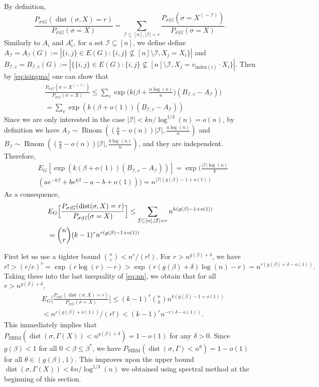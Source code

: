 \documentclass[conference]{IEEEtran}
\DeclareMathOperator{\SIBM}{SIBM}
\newcommand{\cI}{\mathcal{I}}
\DeclareMathOperator{\dist}{dist}
\DeclareMathOperator{\Binom}{Binom}
\begin{document}
By definition,
$$
\frac{P_{\sigma|G} ( \dist(\sigma, X) = r )}{P_{\sigma|G}(\sigma= X)}
=\sum_{\cI\subseteq[n],|\cI|=r} \frac{P_{\sigma|G} ( \sigma= X^{(\sim \cI)} )} {P_{\sigma|G}(\sigma= X)} .
$$
Similarly to $A_i$ and $A^r_i$, for a set $\cI\subseteq[n]$, we define
define
$A_{\cI}=A_{\cI}(G):=|\{i,j\}\in E(G):  \{i, j\} \not\subseteq [n]\setminus\cI, X_j=X_i\}|$ and  
$B_{\cI,v}=B_{\cI,v}(G):=|\{\{i,j\}\in E(G): \{i, j\} \not\subseteq [n]\setminus\cI, X_j= v_{\mathrm{index}(i)} \cdot X_i\}|$.
Then by \eqref{eq:isingma} one can show that
\begin{align*}
& \frac{P_{\sigma|G}(\sigma=X^{(\sim\cI)})}{P_{\sigma|G}(\sigma=X)} 
\le \sum_{v}\exp\Big( k\big(\beta+\frac{\alpha\log(n)}{n} \big) (B_{\cI,v}-A_{\cI})\Big)\\
& = \sum_{v}\exp ( k (\beta + o(1)) (B_{\cI,v}-A_{\cI})
) 
\end{align*}
Since we are only interested in the case $|\cI|<kn/\log^{1/3}(n)=o(n)$,
by definition we have $A_{\cI}\sim\Binom((\frac{n}{k}-o(n))|\cI|,\frac{a\log(n)}{n})$ and $B_{\cI}\sim\Binom((\frac{n}{k}-o(n))|\cI|,\frac{b\log(n)}{n})$, and they are independent. Therefore,
\begin{align*}
&E_G[\exp ( k (\beta +o(1)) (B_{\cI,v}-A_{\cI}) ) ] = 
\exp\Big(\frac{|\cI|\log(n)}{k} \\
&( a e^{-k\beta}+b e^{k\beta} -a-b +o(1) )
\Big) 
=  n^{|\cI|(g(\beta)-1+o(1))}
\end{align*}
As a consequence,
\begin{align} \label{eq:nn}
&E_G \Big[ \frac{P_{\sigma|G} ( \dist(\sigma, X) = r)}{P_{\sigma|G}(\sigma= X)} \Big]
\le \sum_{\cI\subseteq[n],|\cI|=r} 
n^{k (g(\beta)-1+o(1))}\notag\\
&= \binom{n}{r} (k-1)^r n^{r (g(\beta)-1+o(1))}
\end{align}

First let us use a tighter bound $\binom{n}{r}<n^r/(r!)$. 
For $r>n^{g(\beta)+\delta}$, we have
$
r!>(r/e)^r
=\exp(r\log(r)-r)
>\exp(r(g(\beta)+\delta)\log(n)-r)
=n^{r(g(\beta)+\delta-o(1))} .
$
Taking these into the last inequality of \eqref{eq:nn}, we obtain that for all $r>n^{g(\beta)+\delta}$,
\begin{align*}
&E_G \Big[ \frac{P_{\sigma|G} ( \dist(\sigma, X) = r )}{P_{\sigma|G}(\sigma= X)} \Big]
\le  (k-1)^r\binom{n}{k} n^{k (g(\beta)-1+o(1))} \\
&< n^{r (g(\beta)+o(1))} /(r!) 
< (k-1)^rn^{-r(\delta-o(1))} .
\end{align*}
This immediately implies that  $P_{\SIBM} (\dist(\sigma, \Gamma(X))<n^{g(\beta)+\delta} ) = 1- o(1)$ for any $\delta>0$.
Since $g(\beta)<1$ for all $0<\beta\le\beta^\ast$, we have $P_{\SIBM} (\dist(\sigma, \Gamma)<n^{\theta} ) = 1- o(1)$ for all $\theta\in (g(\beta), 1)$.
This improves upon the upper bound 
$\dist(\sigma, \Gamma(X))< kn/\log^{1/3}(n)$ we obtained using spectral method at the beginning of this section.
\end{document}
